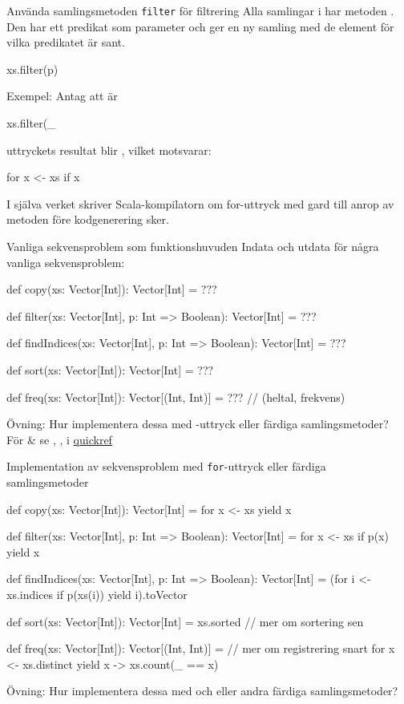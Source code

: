 \begin{Slide}{Använda samlingsmetoden \texttt{filter} för filtrering}
Alla samlingar i  har metoden . Den har ett predikat som parameter  och ger en ny samling med de element för vilka predikatet är sant.
\begin{Code}[basicstyle=\ttfamily\SlideFontSize{12}{14}]
xs.filter(p)
\end{Code}
\pause
Exempel: Antag att  är 
\begin{REPLnonum}
xs.filter(_ %
\end{REPLnonum}
\pause
uttryckets resultat blir , vilket motsvarar:
\begin{Code}[basicstyle=\ttfamily\SlideFontSize{10}{13}]
for x <- xs if x %
\end{Code}
\pause
I själva verket skriver Scala-kompilatorn om for-uttryck med gard till anrop av metoden  före kodgenerering sker.
\end{Slide}


\begin{Slide}{Vanliga sekvensproblem som funktionshuvuden}
Indata och utdata för några vanliga sekvensproblem:
\begin{Code}
def copy(xs: Vector[Int]): Vector[Int] = ???

def filter(xs: Vector[Int], p: Int => Boolean): Vector[Int] = ???

def findIndices(xs: Vector[Int], p: Int => Boolean): Vector[Int] = ???

def sort(xs: Vector[Int]): Vector[Int] = ???

def freq(xs: Vector[Int]): Vector[(Int, Int)] = ???  // (heltal, frekvens)
\end{Code}
Övning: Hur implementera dessa med -uttryck eller färdiga samlingsmetoder?\\
 För \& se , ,  i \href{https://cs.lth.se/pgk/quickref/}{quickref}
\end{Slide}


\begin{Slide}{Implementation av sekvensproblem med \texttt{for}-uttryck eller färdiga samlingsmetoder}
\begin{Code}
def copy(xs: Vector[Int]): Vector[Int] = for x <- xs yield x

def filter(xs: Vector[Int], p: Int => Boolean): Vector[Int] =
  for x <- xs if p(x) yield x

def findIndices(xs: Vector[Int], p: Int => Boolean): Vector[Int] =
  (for i <- xs.indices if p(xs(i)) yield i).toVector

def sort(xs: Vector[Int]): Vector[Int] = xs.sorted // mer om sortering sen

def freq(xs: Vector[Int]): Vector[(Int, Int)] = // mer om registrering snart
  for x <- xs.distinct yield x -> xs.count(_ == x)
\end{Code}
Övning: Hur implementera dessa med  och  eller andra färdiga samlingsmetoder?
\end{Slide}

